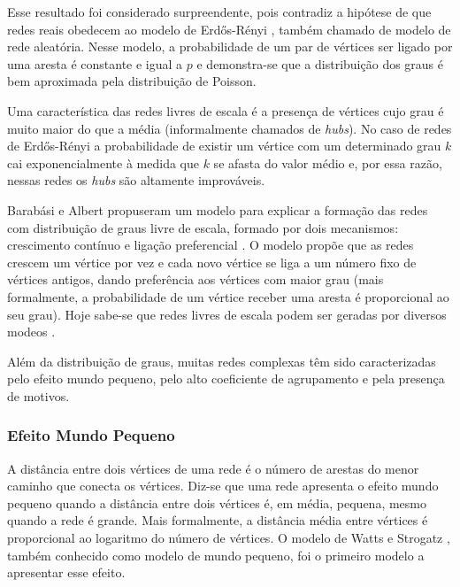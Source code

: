\documentclass{article}
\begin{document}
Esse resultado foi considerado surpreendente, pois contradiz a hipótese de que redes reais obedecem ao modelo de Erdős-Rényi \cite{Erdos1959}, também chamado de modelo de rede aleatória. Nesse modelo, a probabilidade de um par de vértices ser ligado por uma aresta é constante e igual a $p$ e demonstra-se que a distribuição dos graus é bem aproximada pela distribuição de Poisson.

Uma característica das redes livres de escala é a presença de vértices cujo grau é muito maior do que a média (informalmente chamados de \textit{hubs}). No caso de redes de Erdős-Rényi a probabilidade de existir um vértice com um determinado grau $k$ cai exponencialmente à medida que $k$ se afasta do valor médio e, por essa razão, nessas redes os \textit{hubs} são altamente improváveis.

Barabási e Albert propuseram um modelo para explicar a formação das redes com distribuição de graus livre de escala, formado por dois mecanismos: crescimento contínuo e ligação preferencial \cite{Albert2002}. O modelo propõe que as redes crescem um vértice por vez e cada novo vértice se liga a um número fixo de vértices antigos, dando preferência aos vértices com maior grau (mais formalmente, a probabilidade de um vértice receber uma aresta é proporcional ao seu grau). Hoje sabe-se que redes livres de escala podem ser geradas por diversos modeos \cite{Albert2000,Kumar2000,Aiello2000b,Dorogovtsev2002,Bollobas2003,Deo2005}.

Além da distribuição de graus, muitas redes complexas têm sido caracterizadas pelo efeito mundo pequeno, pelo alto coeficiente de agrupamento e pela presença de motivos.


\subsubsection{Efeito Mundo Pequeno}

A distância entre dois vértices de uma rede é o número de arestas do menor caminho que conecta os vértices. Diz-se que uma rede apresenta o efeito mundo pequeno quando a distância entre dois vértices é, em média, pequena, mesmo quando a rede é grande. Mais formalmente, a distância média entre vértices é proporcional ao logaritmo do número de vértices. O modelo de Watts e Strogatz \cite{Watts1998}, também conhecido como modelo de mundo pequeno, foi o primeiro modelo a apresentar esse efeito.
\end{document}
